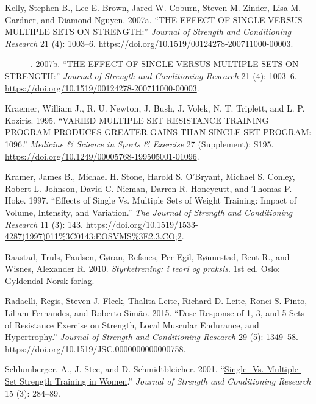 \documentclass[
  letterpaper,
  DIV=11,
  numbers=noendperiod]{scrartcl}
\newlength{\cslhangindent}
\newlength{\cslentryspacingunit} %
\newenvironment{CSLReferences}[2] %
 {%
  \setlength{\parindent}{0pt}
  \ifodd #1
  \let\oldpar\par
  \def\par{\hangindent=\cslhangindent\oldpar}
  \fi
  \setlength{\parskip}{#2\cslentryspacingunit}
 }%
 {}
\begin{document}
\hypertarget{refs}{}
\begin{CSLReferences}{1}{0}
\leavevmode{}%
Kelly, Stephen B., Lee E. Brown, Jared W. Coburn, Steven M. Zinder, Lisa
M. Gardner, and Diamond Nguyen. 2007a. {``{THE} {EFFECT} {OF} {SINGLE}
{VERSUS} {MULTIPLE} {SETS} {ON} {STRENGTH}:''} \emph{Journal of Strength
and Conditioning Research} 21 (4): 1003--6.
\url{https://doi.org/10.1519/00124278-200711000-00003}.

\leavevmode{}%
---------. 2007b. {``THE EFFECT OF SINGLE VERSUS MULTIPLE SETS ON
STRENGTH:''} \emph{Journal of Strength and Conditioning Research} 21
(4): 1003--6. \url{https://doi.org/10.1519/00124278-200711000-00003}.

\leavevmode{}%
Kraemer, William J., R. U. Newton, J. Bush, J. Volek, N. T. Triplett,
and L. P. Koziris. 1995. {``{VARIED} {MULTIPLE} {SET} {RESISTANCE}
{TRAINING} {PROGRAM} {PRODUCES} {GREATER} {GAINS} {THAN} {SINGLE} {SET}
{PROGRAM}: 1096.''} \emph{Medicine \& Science in Sports \& Exercise} 27
(Supplement): S195.
\url{https://doi.org/10.1249/00005768-199505001-01096}.

\leavevmode{}%
Kramer, James B., Michael H. Stone, Harold S. O'Bryant, Michael S.
Conley, Robert L. Johnson, David C. Nieman, Darren R. Honeycutt, and
Thomas P. Hoke. 1997. {``Effects of {Single} Vs. {Multiple} {Sets} of
{Weight} {Training}: {Impact} of {Volume}, {Intensity}, and
{Variation}.''} \emph{The Journal of Strength and Conditioning Research}
11 (3): 143.
\url{https://doi.org/10.1519/1533-4287(1997)011\%3C0143:EOSVMS\%3E2.3.CO;2}.

\leavevmode{}%
Raastad, Truls, Paulsen, Gøran, Refsnes, Per Egil, Rønnestad, Bent R.,
and Wisnes, Alexander R. 2010. \emph{Styrketrening: i teori og praksis}.
1st ed. Oslo: Gyldendal Norsk forlag.

\leavevmode{}%
Radaelli, Regis, Steven J. Fleck, Thalita Leite, Richard D. Leite, Ronei
S. Pinto, Liliam Fernandes, and Roberto Simão. 2015. {``Dose-{Response}
of 1, 3, and 5 {Sets} of {Resistance} {Exercise} on {Strength}, {Local}
{Muscular} {Endurance}, and {Hypertrophy}.''} \emph{Journal of Strength
and Conditioning Research} 29 (5): 1349--58.
\url{https://doi.org/10.1519/JSC.0000000000000758}.

\leavevmode{}%
Schlumberger, A., J. Stec, and D. Schmidtbleicher. 2001.
{``\href{https://www.ncbi.nlm.nih.gov/pubmed/11710652}{Single- Vs.
Multiple-Set Strength Training in Women}.''} \emph{Journal of Strength
and Conditioning Research} 15 (3): 284--89.

\end{CSLReferences}
\end{document}
